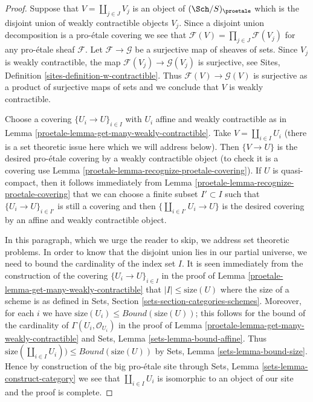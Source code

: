 \begin{proof}

Suppose that $V = \coprod_{j \in J} V_j$ is an object of $(\Sch/S)_\proetale$
which is the disjoint union of weakly contractible objects $V_j$.
Since a disjoint union decomposition is a pro-\'etale covering we
see that $\mathcal{F}(V) = \prod_{j \in J} \mathcal{F}(V_j)$ for any
pro-\'etale sheaf $\mathcal{F}$. Let $\mathcal{F} \to \mathcal{G}$
be a surjective map of sheaves of sets. Since $V_j$ is weakly contractible,
the map $\mathcal{F}(V_j) \to \mathcal{G}(V_j)$ is surjective, see
Sites, Definition \ref{sites-definition-w-contractible}.
Thus $\mathcal{F}(V) \to \mathcal{G}(V)$ is surjective as a product
of surjective maps of sets and we conclude that $V$ is weakly contractible.

\medskip\noindent
Choose a covering $\{U_i \to U\}_{i \in I}$ with $U_i$ affine and
weakly contractible as in Lemma \ref{proetale-lemma-get-many-weakly-contractible}.
Take $V = \coprod_{i \in I} U_i$ (there is a set theoretic issue here
which we will address below). Then $\{V \to U\}$ is the desired
pro-\'etale covering by a weakly contractible object
(to check it is a covering use
Lemma \ref{proetale-lemma-recognize-proetale-covering}).
If $U$ is quasi-compact, then it follows immediately from
Lemma \ref{proetale-lemma-recognize-proetale-covering}
that we can choose a finite subset $I' \subset I$ such that
$\{U_i \to U\}_{i \in I'}$ is still a covering
and then $\{\coprod_{i \in I'} U_i \to U\}$ is the desired covering
by an affine and weakly contractible object.

\medskip\noindent
In this paragraph, which we urge the reader to skip, we address
set theoretic problems. In order to know that the disjoint union
lies in our partial universe, we need to bound the cardinality of
the index set $I$. It is seen immediately from the construction of
the covering $\{U_i \to U\}_{i \in I}$ in the proof of
Lemma \ref{proetale-lemma-get-many-weakly-contractible}
that $|I| \leq \text{size}(U)$ where the size of a scheme is as
defined in Sets, Section \ref{sets-section-categories-schemes}.
Moreover, for each $i$ we have
$\text{size}(U_i) \leq Bound(\text{size}(U))$;
this follows for the bound of the cardinality of
$\Gamma(U_i, \mathcal{O}_{U_i})$ in
the proof of Lemma \ref{proetale-lemma-get-many-weakly-contractible}
and Sets, Lemma \ref{sets-lemma-bound-affine}.
Thus $\text{size}(\coprod_{i \in I} U_i)) \leq Bound(\text{size}(U))$
by Sets, Lemma \ref{sets-lemma-bound-size}.
Hence by construction of the big pro-\'etale site through
Sets, Lemma \ref{sets-lemma-construct-category}
we see that $\coprod_{i \in I} U_i$ is isomorphic to an object
of our site and the proof is complete.
\end{proof}

